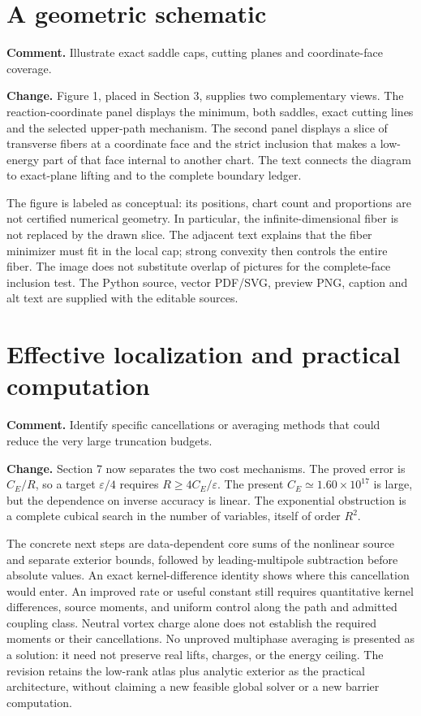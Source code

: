 \documentclass[10pt]{article}
\begin{document}
\clearpage
\section{A geometric schematic}

\textbf{Comment.} Illustrate exact saddle caps, cutting planes and
coordinate-face coverage.

\textbf{Change.} Figure 1, placed in Section 3, supplies two complementary
views. The reaction-coordinate panel displays the minimum, both saddles,
exact cutting lines and the selected upper-path mechanism. The second
panel displays a slice of transverse fibers at a coordinate face and the
strict inclusion that makes a low-energy part of that face internal to
another chart. The text connects the diagram to exact-plane lifting and
to the complete boundary ledger.

The figure is labeled as conceptual: its positions, chart count and
proportions are not certified numerical geometry. In particular, the
infinite-dimensional fiber is not replaced by the drawn slice. The
adjacent text explains that the fiber minimizer must fit in the local cap;
strong convexity then controls the entire fiber. The image does not
substitute overlap of pictures for the complete-face inclusion test.
The Python source, vector PDF/SVG, preview PNG, caption and alt text
are supplied with the editable sources.

\section{Effective localization and practical computation}

\textbf{Comment.} Identify specific cancellations or averaging methods
that could reduce the very large truncation budgets.

\textbf{Change.} Section 7 now separates the two cost mechanisms.
The proved error is $C_E/R$, so a target $\varepsilon/4$ requires
$R\ge4C_E/\varepsilon$. The present $C_E\simeq1.60\times10^{17}$
is large, but the dependence on inverse accuracy is linear.
The exponential obstruction is a complete cubical search in the
number of variables, itself of order $R^2$.

The concrete next steps are data-dependent core sums of the nonlinear
source and separate exterior bounds, followed by leading-multipole
subtraction before absolute values. An exact kernel-difference identity
shows where this cancellation would enter. An improved rate or useful
constant still requires quantitative kernel differences, source moments,
and uniform control along the path and admitted coupling class.
Neutral vortex charge alone does not establish the required moments or
their cancellations. No unproved multiphase averaging is presented as
a solution: it need not preserve real lifts, charges, or the energy
ceiling. The revision retains the low-rank atlas plus analytic exterior
as the practical architecture, without claiming a new feasible global
solver or a new barrier computation.
\end{document}
